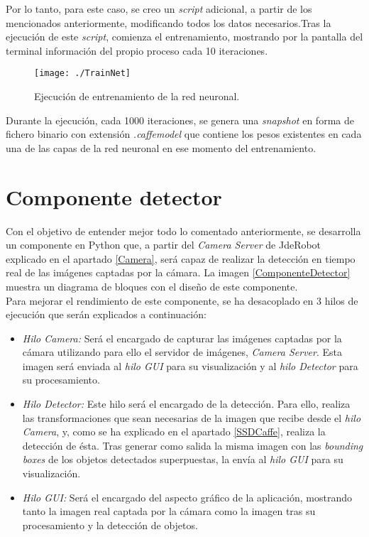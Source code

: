 \documentclass[a4paper, 12pt, oneside]{book}
\begin{document}
Por lo tanto, para este caso, se creo un \textit{script} adicional, a partir de los mencionados anteriormente, modificando todos los datos necesarios.Tras la ejecución de este \textit{script}, comienza el entrenamiento, mostrando por la pantalla del terminal información del propio proceso cada 10 iteraciones.\\

\begin{figure}[H]
\begin{center}
\texttt{[image: ./TrainNet]}
\caption{Ejecución de entrenamiento de la red neuronal.}
\label{EjecucionTrain}
\end{center}
\end{figure}

Durante la ejecución, cada 1000 iteraciones, se genera una \textit{snapshot} en forma de fichero binario con extensión \textit{.caffemodel} que contiene los pesos existentes en cada una de las capas de la red neuronal en ese momento del entrenamiento.

\section{Componente 
 detector}
\label{ComponenteDetector}

Con el objetivo de entender mejor todo lo comentado anteriormente, se desarrolla un componente en Python que, a partir del \textit{Camera Server} de JdeRobot explicado en el apartado \ref{Camera}, será capaz de realizar la detección en tiempo real de las imágenes captadas por la cámara. La imagen \ref{ComponenteDetector} muestra un diagrama de bloques con el diseño de este componente.\\

Para mejorar el rendimiento de este componente, se ha desacoplado en 3 hilos de ejecución que serán explicados a continuación:

\begin{itemize}
\item \textit{Hilo Camera:} Será el encargado de capturar las imágenes captadas por la cámara utilizando para ello el servidor de imágenes, \textit{Camera Server}. Esta imagen será enviada al \textit{hilo GUI} para su visualización y al \textit{hilo Detector} para su procesamiento. 
\item  \textit{Hilo Detector:} Este hilo será el encargado de la detección. Para ello, realiza las transformaciones que sean necesarias de la imagen que recibe desde el \textit{hilo Camera}, y, como se ha explicado en el apartado \ref{SSDCaffe}, realiza la detección de ésta. Tras generar como salida la misma imagen con las \textit{bounding boxes} de los objetos detectados superpuestas, la envía al \textit{hilo GUI} para su visualización.
\item \textit{Hilo GUI:} Será el encargado del aspecto gráfico de la aplicación, mostrando tanto la imagen real captada por la cámara como la imagen tras su procesamiento y la detección de objetos.
\end{itemize}
\end{document}
